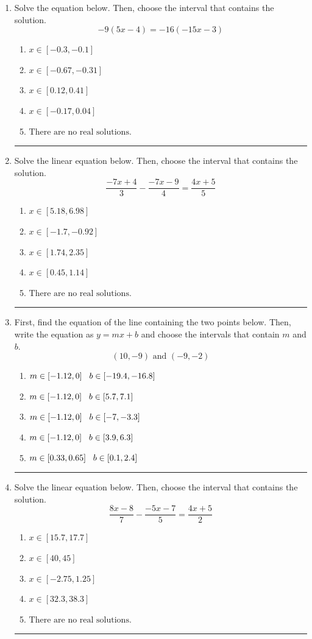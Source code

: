 \documentclass[14pt]{extbook}
\newcommand{\litem}[1]{\item#1\hspace*{-1cm}\rule{\textwidth}{0.4pt}}
\begin{document}
\begin{enumerate}
{\begin{enumerate}[label=\Alph*.]
\end{enumerate} }
\litem{
Solve the equation below. Then, choose the interval that contains the solution.\[ -9(5x -4) = -16(-15x -3) \]\begin{enumerate}[label=\Alph*.]
\item \( x \in [-0.3, -0.1] \)
\item \( x \in [-0.67, -0.31] \)
\item \( x \in [0.12, 0.41] \)
\item \( x \in [-0.17, 0.04] \)
\item \( \text{There are no real solutions.} \)

\end{enumerate} }
\litem{
Solve the linear equation below. Then, choose the interval that contains the solution.\[ \frac{-7x + 4}{3} - \frac{-7x -9}{4} = \frac{4x + 5}{5} \]\begin{enumerate}[label=\Alph*.]
\item \( x \in [5.18, 6.98] \)
\item \( x \in [-1.7, -0.92] \)
\item \( x \in [1.74, 2.35] \)
\item \( x \in [0.45, 1.14] \)
\item \( \text{There are no real solutions.} \)

\end{enumerate} }
\litem{
First, find the equation of the line containing the two points below. Then, write the equation as $ y=mx+b $ and choose the intervals that contain $m$ and $b$.\[ (10, -9) \text{ and } (-9, -2) \]\begin{enumerate}[label=\Alph*.]
\item \( m \in [-1.12, 0] \hspace*{3mm} b \in [-19.4, -16.8] \)
\item \( m \in [-1.12, 0] \hspace*{3mm} b \in [5.7, 7.1] \)
\item \( m \in [-1.12, 0] \hspace*{3mm} b \in [-7, -3.3] \)
\item \( m \in [-1.12, 0] \hspace*{3mm} b \in [3.9, 6.3] \)
\item \( m \in [0.33, 0.65] \hspace*{3mm} b \in [0.1, 2.4] \)

\end{enumerate} }
\litem{
Solve the linear equation below. Then, choose the interval that contains the solution.\[ \frac{8x -8}{7} - \frac{-5x -7}{5} = \frac{4x + 5}{2} \]\begin{enumerate}[label=\Alph*.]
\item \( x \in [15.7, 17.7] \)
\item \( x \in [40, 45] \)
\item \( x \in [-2.75, 1.25] \)
\item \( x \in [32.3, 38.3] \)
\item \( \text{There are no real solutions.} \)

\end{enumerate} }
\end{enumerate}
\end{document}
